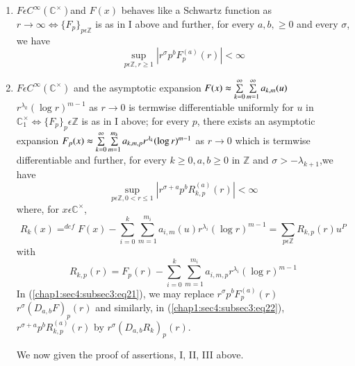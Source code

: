 \begin{enumerate}
\item $F\epsilon C^{\infty}(\mathbb{C}^\times)$\pageoriginale and $F(x)$ behaves like a
  Schwartz function as $r\rightarrow \infty \Leftrightarrow
  \{F_p\}_{p\epsilon \mathbb{Z}}$ is as in I above and further, for
  every $a,b, \ge 0$ and every $\sigma$, we have
\begin{equation*}
  {\displaystyle{\mathop{\sup}_{p\epsilon \mathbb{Z},r\ge
        1}}}|r^{\sigma}p^bF^{(a)}_{p}(r)|<\infty \tag{21}
  \label{chap1:sec4:subsec3:eq21}
\end{equation*}
\item $F\epsilon C^{\infty}(\mathbb{C}^\times)$ and the asymptotic expansion
  $F(x)\thickapprox
  \sum\limits_{k=0}^{\infty}\sum\limits_{m=1}^{\infty}a_{k,m}(u)$ $r^{\lambda_{k}}(\log 
    r)^{m-1}$ as $r \rightarrow 0$ is termwise differentiable uniformly
    for $u$ in
    $\mathbb{C}_{1}^\times\Leftrightarrow \{F_{p}\}_{p}\epsilon\mathbb{Z}$
    is as in I above; for every $p$, there exists an asymptotic
    expansion $F_{p}(x)\thickapprox \sum\limits_{k=0}^{\infty}
    \sum\limits_{m=1}^{m_{k}}a_{k,m,p}r^{\lambda_{k}} (\log r)^{m-1}$
      as $r \rightarrow 0 $ which is termwise differentiable and
      further, for every $k \ge 0,a,b\ge 0$ in $\mathbb{Z}$ and
      $\sigma > -\lambda_{k+1}$,we have 
\begin{equation*}
  {\displaystyle{\mathop{\sup}_{p\epsilon \mathbb{Z},0<r\le 
        1}}}|r^{{\sigma}+a}p^bR_{k,p}^{(a)}(r)|<\infty\tag{22} 
  \label{chap1:sec4:subsec3:eq22}  
\end{equation*}
where, for $x\epsilon \mathbb{C}^\times$,
\begin{equation*}
R_{k}(x){\displaystyle{\mathop{=}^{def}}}F(x)-\sum\limits_{i=0}^{k}\sum\limits_{m=1}^{m_{i}}
a_{i,m}(u)r^{\lambda_{i}}(\log r)^{m-1}=\sum\limits_{p\epsilon \mathbb{Z}}R_{k,p}(r)u^P
\end{equation*}
with
\begin{equation*}
R_{k,p}(r)=F_{p}(r) -\sum\limits_{i=0}^{k}\sum\limits_{m=1}^{m_{i}}a_{i,m,p}r^{\lambda_{i}}{(\log r)}^{m-1}
\end{equation*}
In (\ref{chap1:sec4:subsec3:eq21}), we may replace $r^{\sigma}p^bF^{(a)}_{p}(r)$
$r^{\sigma}(D_{a,b}F)_{p}(r)$ and similarly, in (\ref{chap1:sec4:subsec3:eq22}),
$r^{\sigma+a}p^bR_{k,p}^{(a)}(r)$ by
$r^{\sigma}(D_{a,b}R_{k})_{p}(r)$. 

We now given the proof of assertions, I, II, III above.
\end{enumerate}

